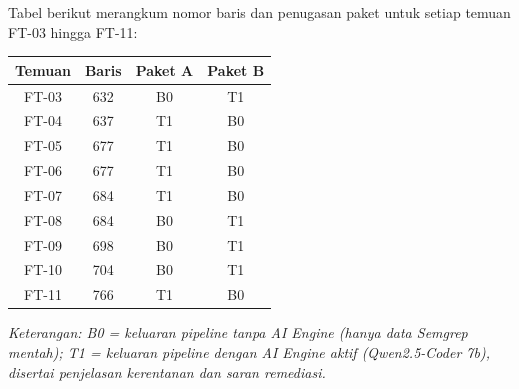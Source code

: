 Tabel berikut merangkum nomor baris dan penugasan paket
untuk setiap temuan FT-03 hingga FT-11:

\begin{center}
\renewcommand{\arraystretch}{1.3}
\begin{tabular}{|c|c|c|c|}
\hline
\textbf{Temuan} & \textbf{Baris} & \textbf{Paket A} & \textbf{Paket B} \\
\hline
FT-03 & 632 & B0 & T1 \\
\hline
FT-04 & 637 & T1 & B0 \\
\hline
FT-05 & 677 & T1 & B0 \\
\hline
FT-06 & 677 & T1 & B0 \\
\hline
FT-07 & 684 & T1 & B0 \\
\hline
FT-08 & 684 & B0 & T1 \\
\hline
FT-09 & 698 & B0 & T1 \\
\hline
FT-10 & 704 & B0 & T1 \\
\hline
FT-11 & 766 & T1 & B0 \\
\hline
\end{tabular}
\end{center}

\noindent\textit{Keterangan: B0 = keluaran \textit{pipeline} tanpa
\textit{AI Engine} (hanya data Semgrep mentah); T1 = keluaran
\textit{pipeline} dengan \textit{AI Engine} aktif (Qwen2.5-Coder 7b),
disertai penjelasan kerentanan dan saran remediasi.}
